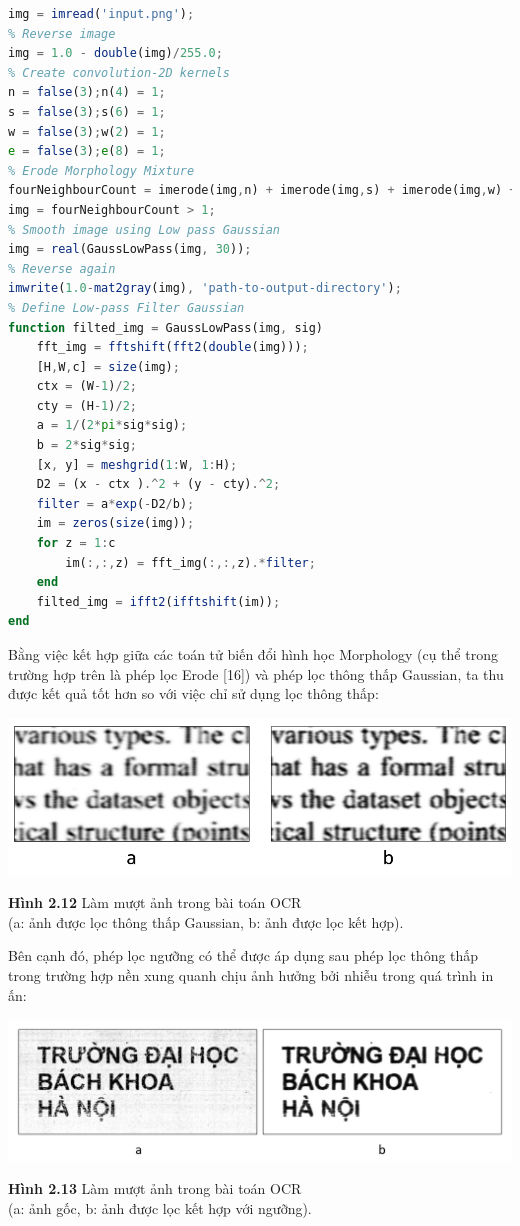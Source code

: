 \begin{lstlisting}[language=Octave]
img = imread('input.png');
% Reverse image
img = 1.0 - double(img)/255.0;
% Create convolution-2D kernels
n = false(3);n(4) = 1;
s = false(3);s(6) = 1;
w = false(3);w(2) = 1;
e = false(3);e(8) = 1;
% Erode Morphology Mixture
fourNeighbourCount = imerode(img,n) + imerode(img,s) + imerode(img,w) + img;
img = fourNeighbourCount > 1;
% Smooth image using Low pass Gaussian
img = real(GaussLowPass(img, 30));
% Reverse again
imwrite(1.0-mat2gray(img), 'path-to-output-directory');
% Define Low-pass Filter Gaussian
function filted_img = GaussLowPass(img, sig)
    fft_img = fftshift(fft2(double(img)));
    [H,W,c] = size(img);
    ctx = (W-1)/2;
    cty = (H-1)/2;
    a = 1/(2*pi*sig*sig);
    b = 2*sig*sig;
    [x, y] = meshgrid(1:W, 1:H);
    D2 = (x - ctx ).^2 + (y - cty).^2;
    filter = a*exp(-D2/b);
    im = zeros(size(img));
    for z = 1:c
        im(:,:,z) = fft_img(:,:,z).*filter;
    end 
    filted_img = ifft2(ifftshift(im));
end
\end{lstlisting}
Bằng việc kết hợp giữa các toán tử biến đổi hình học Morphology (cụ thể trong trường hợp trên là phép lọc Erode [16]) và phép lọc thông thấp Gaussian, ta thu được kết quả tốt hơn so với việc chỉ sử dụng lọc thông thấp:
\begin{center}
    \includegraphics[scale=0.65]{Figures/fig15a.png}
    \par \textbf {Hình 2.12} Làm mượt ảnh trong bài toán OCR \\(a: ảnh được lọc thông thấp Gaussian, b: ảnh được lọc kết hợp).
\end{center}
Bên cạnh đó, phép lọc ngưỡng có thể được áp dụng sau phép lọc thông thấp trong trường hợp nền xung quanh chịu ảnh hưởng bởi nhiễu trong quá trình in ấn:
\begin{center}
    \includegraphics[scale=0.50]{Figures/fig15c.png}
    \par \textbf {Hình 2.13} Làm mượt ảnh trong bài toán OCR \\(a: ảnh gốc, b: ảnh được lọc kết hợp với ngưỡng).
\end{center}
